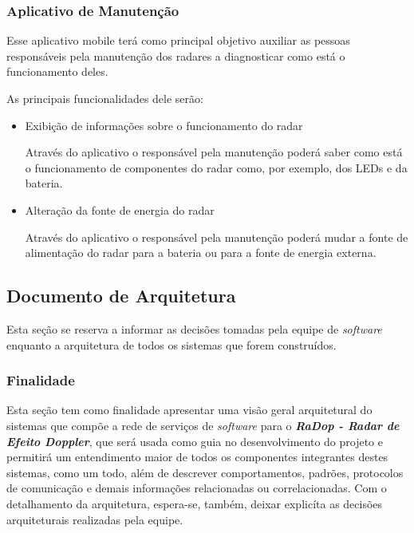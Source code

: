 \subsubsection{Aplicativo de Manutenção}

Esse aplicativo mobile terá como principal objetivo auxiliar as pessoas responsáveis pela manutenção dos radares a diagnosticar como está o funcionamento deles.

As principais funcionalidades dele serão:

\begin{itemize}


\item{Exibição de informações sobre o funcionamento do radar}

Através do aplicativo o responsável pela manutenção poderá saber como está o funcionamento de componentes do radar como, por exemplo, dos LEDs e da bateria.

\item{Alteração da fonte de energia do radar}

Através do aplicativo o responsável pela manutenção poderá mudar a fonte de alimentação do radar para a bateria ou para a fonte de energia externa.

\end{itemize}

\subsection{Documento de Arquitetura}\label{documento-de-arquitetura}

Esta seção se reserva a informar as decisões tomadas pela equipe de \emph{software} enquanto a arquitetura de todos os sistemas que forem construídos.

\subsubsection{Finalidade}\label{finalidade}

Esta seção tem como finalidade apresentar uma visão geral arquitetural
do sistemas que compõe a rede de serviços de \emph{software} para o
\textbf{\emph{RaDop - Radar de Efeito Doppler}}, que será usada como
guia no desenvolvimento do projeto e permitirá um entendimento maior de
todos os componentes integrantes destes sistemas, como um todo, além de
descrever comportamentos, padrões, protocolos de comunicação e demais
informações relacionadas ou correlacionadas. Com o detalhamento da
arquitetura, espera-se, também, deixar explicíta as decisões
arquiteturais realizadas pela equipe.

